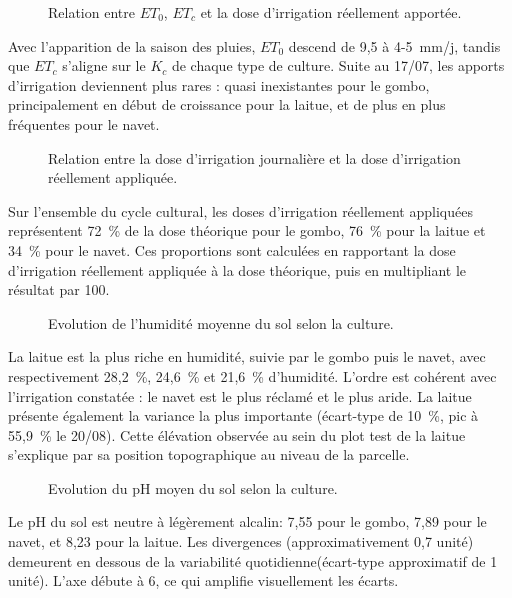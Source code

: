\begin{figure}[H]
    \centering
    \caption{Relation entre $ET_0$, $ET_c$ et la dose d’irrigation réellement apportée. }
    \label{fig:eto-etc-Di5}
\end{figure}
Avec l'apparition de la saison des pluies, $ET_0$ descend de 9,5 à 4-5~mm/j, tandis que $ET_c$ s'aligne sur le $K_c$ de chaque type de culture. Suite au 17/07, les apports d’irrigation deviennent plus rares : quasi inexistantes pour le gombo, principalement en début de croissance pour la  laitue, et de plus en plus fréquentes pour le navet.

\begin{figure}[H]
    \centering
    \caption{Relation entre la dose d’irrigation journalière et la dose d’irrigation réellement appliquée. }
    \label{fig:Di-Di-aporter5}
\end{figure}
Sur l’ensemble du cycle cultural, les doses d’irrigation réellement appliquées représentent 72~\% de la dose théorique pour le gombo, 76~\% pour la laitue et 34~\% pour le navet. Ces proportions sont calculées en rapportant la dose d’irrigation réellement appliquée à la dose théorique, puis en multipliant le résultat par 100.

\begin{figure}[H]
    \centering
    \caption{Evolution de l’humidité moyenne du sol selon la culture. }
    \label{fig:evolution-hum}
\end{figure}
La laitue est la plus riche en humidité, suivie par le gombo puis le navet, avec respectivement 28,2~\%, 24,6~\% et 21,6~\% d'humidité. L’ordre est cohérent avec l'irrigation constatée : le navet est le plus réclamé et le plus aride. La laitue présente également la variance la plus importante (écart-type de 10~\%, pic à 55,9~\% le 20/08). Cette élévation observée au sein du plot test de la laitue s’explique par sa position topographique au niveau de la parcelle.

\begin{figure}[H]
    \centering
    \caption{Evolution du pH moyen du sol selon la culture. }
    \label{fig:ph-sol5}
\end{figure}
Le pH du sol est neutre à légèrement alcalin: 7,55 pour le gombo, 7,89 pour le navet, et 8,23 pour la laitue. Les divergences (approximativement 0,7 unité) demeurent en dessous de la variabilité quotidienne(écart-type approximatif de 1 unité). L'axe débute à 6, ce qui amplifie visuellement les écarts.

